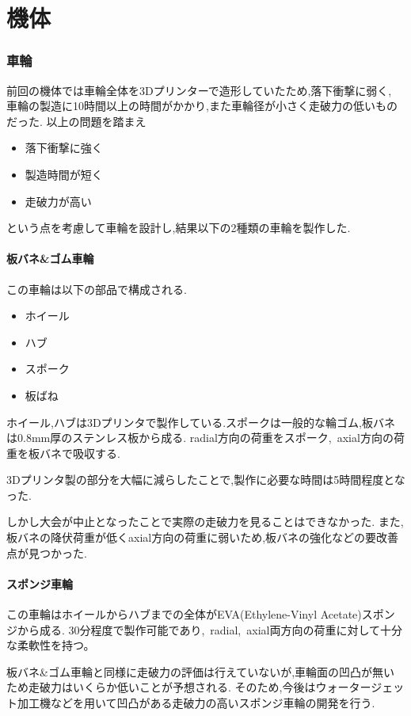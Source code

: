 \part*{機体}
\section{車輪}
前回の機体では車輪全体を3Dプリンターで造形していたため,落下衝撃に弱く,
車輪の製造に10時間以上の時間がかかり,また車輪径が小さく走破力の低いものだった.
以上の問題を踏まえ
\begin{itemize}
  \item 落下衝撃に強く
  \item 製造時間が短く
  \item 走破力が高い
\end{itemize}
という点を考慮して車輪を設計し,結果以下の2種類の車輪を製作した.
\vfill\null
\columnbreak
\subsection{板バネ\&ゴム車輪}
この車輪は以下の部品で構成される.
\begin{itemize}
  \item ホイール
  \item ハブ
  \item スポーク
  \item 板ばね
\end{itemize}
ホイール,ハブは3Dプリンタで製作している.スポークは一般的な輪ゴム,板バネは0.8mm厚のステンレス板から成る.
radial方向の荷重をスポーク,\ axial方向の荷重を板バネで吸収する.

3Dプリンタ製の部分を大幅に減らしたことで,製作に必要な時間は5時間程度となった.

しかし大会が中止となったことで実際の走破力を見ることはできなかった.
また,板バネの降伏荷重が低くaxial方向の荷重に弱いため,板バネの強化などの要改善点が見つかった.
\vfill\null
\columnbreak
{}
\subsection{スポンジ車輪}
この車輪はホイールからハブまでの全体がEVA(Ethylene-Vinyl Acetate)スポンジから成る.
30分程度で製作可能であり,\ radial,\ axial両方向の荷重に対して十分な柔軟性を持つ。

板バネ\&ゴム車輪と同様に走破力の評価は行えていないが,車輪面の凹凸が無いため走破力はいくらか低いことが予想される.
そのため,今後はウォータージェット加工機などを用いて凹凸がある走破力の高いスポンジ車輪の開発を行う.
\vfill\null
\columnbreak
